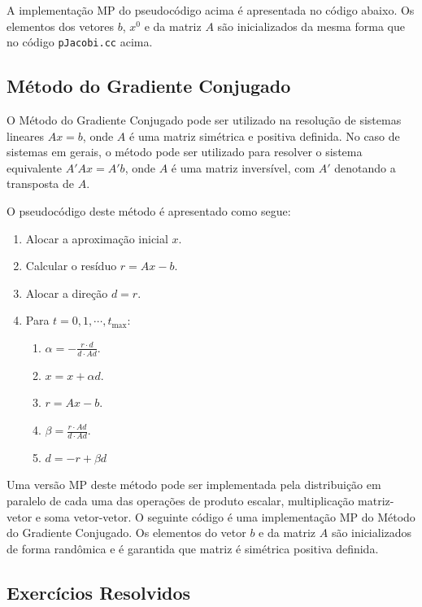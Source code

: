 A implementação MP do pseudocódigo acima é apresentada no código abaixo. Os elementos dos vetores $b$, $x^0$ e da matriz $A$ são inicializados da mesma forma que no código \verb+pJacobi.cc+ acima.



\subsection{Método do Gradiente Conjugado}

O Método do Gradiente Conjugado pode ser utilizado na resolução de sistemas lineares $Ax = b$, onde $A$ é uma matriz simétrica e positiva definida. No caso de sistemas em gerais, o método pode ser utilizado para resolver o sistema equivalente $A'Ax = A'b$, onde $A$ é uma matriz inversível, com $A'$ denotando a transposta de $A$.

O pseudocódigo deste método é apresentado como segue:
\begin{enumerate}
\item Alocar a aproximação inicial $x$.
\item Calcular o resíduo $r = Ax - b$.
\item Alocar a direção $d = r$.
\item Para $t=0,1,\cdots,t_{\text{max}}$:
  \begin{enumerate}
  \item $\displaystyle \alpha = -\frac{r\cdot d}{d\cdot Ad}$.
  \item $x = x + \alpha d$.
  \item $r = Ax - b$.
  \item $\displaystyle \beta = \frac{r\cdot Ad}{d\cdot Ad}$.
  \item $d = -r + \beta d$
  \end{enumerate}
\end{enumerate}

Uma versão MP deste método pode ser implementada pela distribuição em paralelo de cada uma das operações de produto escalar, multiplicação matriz-vetor e soma vetor-vetor. O seguinte código é uma implementação MP do Método do Gradiente Conjugado. Os elementos do vetor $b$ e da matriz $A$ são inicializados de forma randômica e é garantida que matriz é simétrica positiva definida.



\subsection*{Exercícios Resolvidos}

